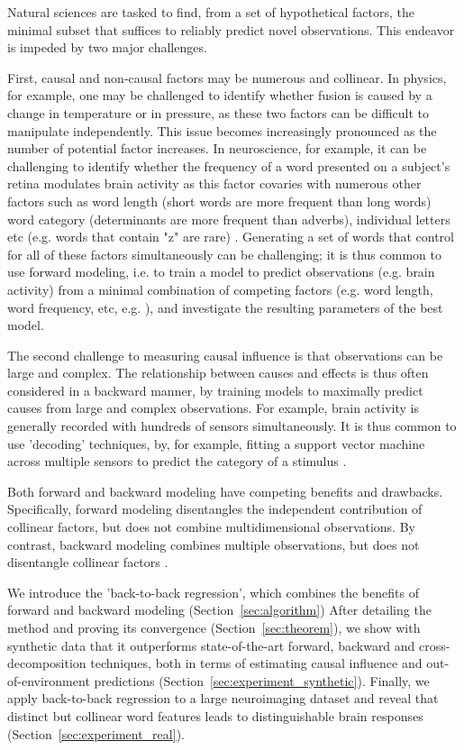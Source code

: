 Natural sciences are tasked to find, from a set of hypothetical factors, the minimal subset that suffices to reliably predict novel observations. This endeavor is impeded by two major challenges.

First, causal and non-causal factors may be numerous and collinear. In physics, for example, one may be challenged to identify whether fusion is caused by a change in temperature or in pressure, as these two factors can be difficult to manipulate independently. This issue becomes increasingly pronounced as the number of potential factor increases. In neuroscience, for example, it can be challenging to identify whether the frequency of a word presented on a subject's retina modulates brain activity as this factor covaries with numerous other factors such as word length (short words are more frequent than long words) word category (determinants are more frequent than adverbs), individual letters etc (e.g. words that contain "z" are rare) \citep{kutas2011thirty,pegado2014timing}. Generating a set of words that control for all of these factors simultaneously can be challenging; it is thus common to use forward modeling, i.e. to train a model to predict observations (e.g. brain activity) from a minimal combination of competing factors (e.g. word length, word frequency, etc, e.g. \citep{huth2016natural}), and investigate the resulting parameters of the best model.

The second challenge to measuring causal influence is that observations can be large and complex. The relationship between causes and effects is thus often considered in a backward manner, by training models to maximally predict causes from large and complex observations. For example, brain activity is generally recorded with hundreds of sensors simultaneously. It is thus common to use 'decoding' techniques, by, for example, fitting a support vector machine across multiple sensors to predict the category of a stimulus \citep{cichy2014resolving, king2016brain, kriegeskorte2008representational}.


Both forward and backward modeling have competing benefits and drawbacks. Specifically, forward modeling disentangles the independent contribution of collinear factors, but does not combine multidimensional observations. By contrast, backward modeling combines multiple observations, but does not disentangle collinear factors \citep{weichwald2015causal, hebart_neuroimage_2015, king2018encoding}.

We introduce the 'back-to-back regression', which combines the benefits of forward and backward modeling (Section~\ref{sec:algorithm}) After detailing the method and proving its convergence (Section~\ref{sec:theorem}), we show with synthetic data that it outperforms state-of-the-art forward, backward and cross-decomposition techniques, both in terms of estimating causal influence and out-of-environment predictions (Section~\ref{sec:experiment_synthetic}). Finally, we apply back-to-back regression to a large neuroimaging dataset and reveal that distinct but collinear word features leads to distinguishable brain responses (Section~\ref{sec:experiment_real}).
